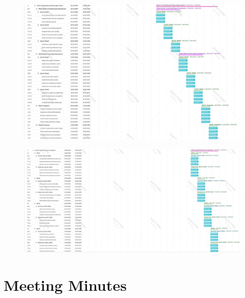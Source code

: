\documentclass[a4paper,12pt, oneside]{report}
\begin{document}
\begin{appendices}
\begin{figure}[H]
\end{figure}
\begin{figure}[H]
    \centering
    \includegraphics[width=\textwidth]{GanttCharts/GRP_GanttGraph_Expanded_P3.png}
\end{figure}
\begin{figure}[H]
    \centering
    \includegraphics[width=\textwidth]{GanttCharts/GRP_GanttGraph_Expanded_P4.png}
\end{figure}
\chapter{Meeting Minutes}

\end{appendices}
\end{document}
